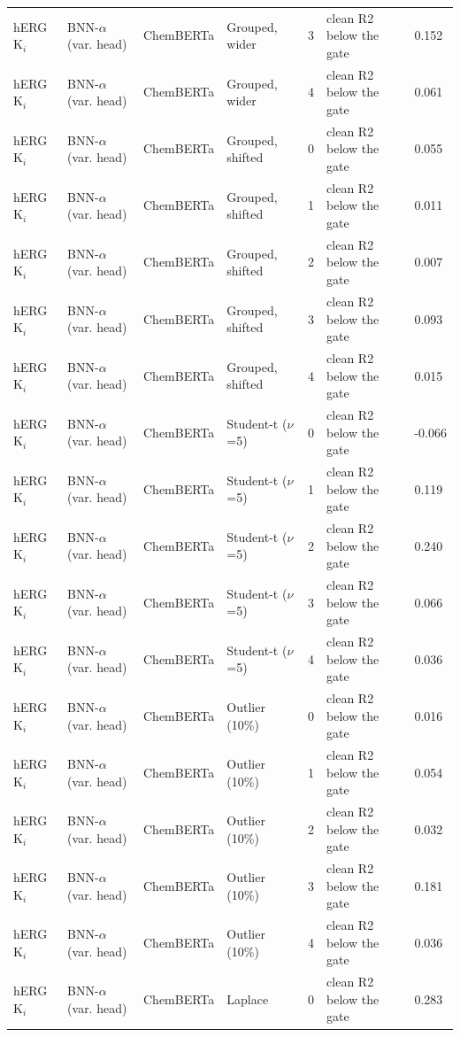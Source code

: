 {\begin{longtable}{llllcll}
hERG K$_i$ & BNN-$\alpha$ (var. head) & ChemBERTa & Grouped, wider & 3 & clean R2 below the gate & 0.152 \\
hERG K$_i$ & BNN-$\alpha$ (var. head) & ChemBERTa & Grouped, wider & 4 & clean R2 below the gate & 0.061 \\
hERG K$_i$ & BNN-$\alpha$ (var. head) & ChemBERTa & Grouped, shifted & 0 & clean R2 below the gate & 0.055 \\
hERG K$_i$ & BNN-$\alpha$ (var. head) & ChemBERTa & Grouped, shifted & 1 & clean R2 below the gate & 0.011 \\
hERG K$_i$ & BNN-$\alpha$ (var. head) & ChemBERTa & Grouped, shifted & 2 & clean R2 below the gate & 0.007 \\
hERG K$_i$ & BNN-$\alpha$ (var. head) & ChemBERTa & Grouped, shifted & 3 & clean R2 below the gate & 0.093 \\
hERG K$_i$ & BNN-$\alpha$ (var. head) & ChemBERTa & Grouped, shifted & 4 & clean R2 below the gate & 0.015 \\
hERG K$_i$ & BNN-$\alpha$ (var. head) & ChemBERTa & Student-t ($\nu$=5) & 0 & clean R2 below the gate & -0.066 \\
hERG K$_i$ & BNN-$\alpha$ (var. head) & ChemBERTa & Student-t ($\nu$=5) & 1 & clean R2 below the gate & 0.119 \\
hERG K$_i$ & BNN-$\alpha$ (var. head) & ChemBERTa & Student-t ($\nu$=5) & 2 & clean R2 below the gate & 0.240 \\
hERG K$_i$ & BNN-$\alpha$ (var. head) & ChemBERTa & Student-t ($\nu$=5) & 3 & clean R2 below the gate & 0.066 \\
hERG K$_i$ & BNN-$\alpha$ (var. head) & ChemBERTa & Student-t ($\nu$=5) & 4 & clean R2 below the gate & 0.036 \\
hERG K$_i$ & BNN-$\alpha$ (var. head) & ChemBERTa & Outlier (10\%) & 0 & clean R2 below the gate & 0.016 \\
hERG K$_i$ & BNN-$\alpha$ (var. head) & ChemBERTa & Outlier (10\%) & 1 & clean R2 below the gate & 0.054 \\
hERG K$_i$ & BNN-$\alpha$ (var. head) & ChemBERTa & Outlier (10\%) & 2 & clean R2 below the gate & 0.032 \\
hERG K$_i$ & BNN-$\alpha$ (var. head) & ChemBERTa & Outlier (10\%) & 3 & clean R2 below the gate & 0.181 \\
hERG K$_i$ & BNN-$\alpha$ (var. head) & ChemBERTa & Outlier (10\%) & 4 & clean R2 below the gate & 0.036 \\
hERG K$_i$ & BNN-$\alpha$ (var. head) & ChemBERTa & Laplace & 0 & clean R2 below the gate & 0.283 \\

\end{longtable}}
